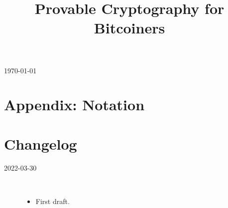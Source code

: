 \documentclass[
  a4paper,
  orivec,oribibl]{llncs}
\title{\texorpdfstring{%
    Provable Cryptography for Bitcoiners%
  }{%
    Provable Cryptography for Bitcoiners%
  }
}
\author{\texorpdfstring{%
      Alice Author\inst{1}\orcidID{0000-0000-0000-0000}
      \and Bob Author\inst{2}\orcidID{0000-0000-0000-0000}
    }{%
      Alice Author;
      Bob Author
    }}
\institute{%
    Some Institute
    \and Some University
  }
\author{\vspace{-4ex}}\institute{}
\begin{document}
\maketitle
\iffull
  \begin{center}
    \today
  \end{center}
\fi

\begin{abstract}
  
\end{abstract}

\ifcameraready
\fi

\iffull
  \tableofcontents
  \clearpage
\fi

% 







\appendix
{}

\section{Appendix: Notation}\label{sec:appendix-notation}


\iffull

  \section*{Changelog}\label{sec:changelog}
  \begin{description}
    \item[2022-03-30]\
          \begin{itemize}
            \item First draft.
          \end{itemize}
  \end{description}
  \vspace{-2em}
\fi

{}
\printbibliography\label{sec:bib}
\end{document}
